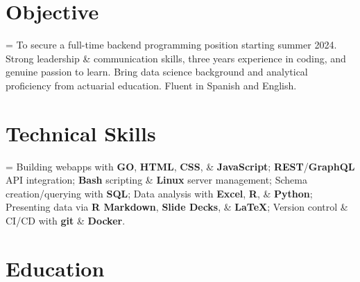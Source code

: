 \documentclass[12pt]{article}
\newcommand{\itemspace}{\vspace{0.3170em}}
\renewcommand{\textsc}[1]{\uppercase{\footnotesize#1}\normalsize}
\begin{document}
\maketitle

\vspace{-2.8mm}
\noindent\hrulefill

\vspace{-4.5mm}
\noindent\hrulefill

\itemspace
\section{Objective}

\hangindent=\parindent %
To secure a full-time backend programming position starting summer 2024.
Strong leadership \& communication skills, three years experience in coding,
and genuine passion to learn. Bring data science background and analytical
proficiency from actuarial education. Fluent in Spanish and English.

\itemspace

\section{Technical Skills}

\hangindent=\parindent %
Building webapps with \textbf{\textsc{go}}, \textbf{\textsc{html}}, \textbf{\textsc{css}},
  \& \textbf{JavaScript};
\textbf{REST}/\textbf{GraphQL} API integration;
\textbf{Bash} scripting \& \textbf{Linux} server management;
Schema creation/querying with \textbf{\textsc{sql}};
Data analysis with \textbf{Excel}, \textbf{\textsc{r}}, \& \textbf{Python};
Presenting data via \textbf{R Markdown}, \textbf{Slide Decks}, \& \textbf{\LaTeX{}};
Version control \& CI/CD with \textbf{git} \& \textbf{Docker}.

\itemspace

\section{Education}
\end{document}
